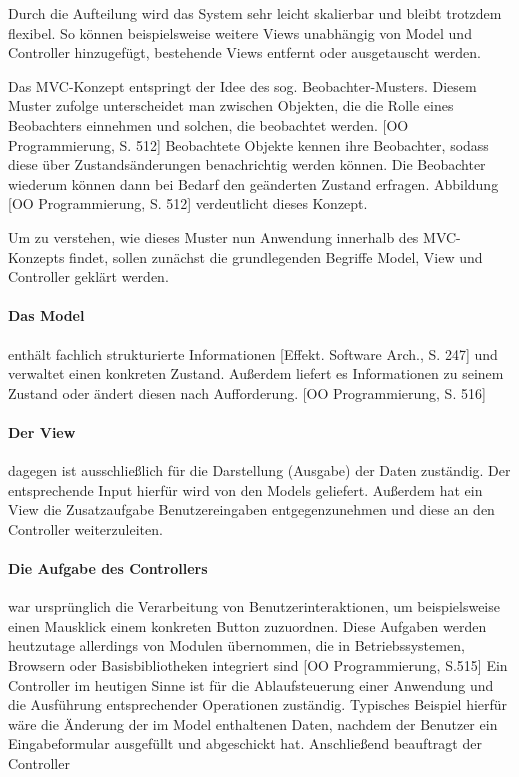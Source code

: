Durch die Aufteilung wird das System sehr leicht skalierbar und bleibt trotzdem flexibel. So können beispielsweise weitere Views unabhängig von Model und Controller hinzugefügt, bestehende Views entfernt oder ausgetauscht werden.

Das MVC-Konzept entspringt der Idee des sog. Beobachter-Musters. Diesem Muster zufolge unterscheidet man zwischen Objekten, die die Rolle eines Beobachters einnehmen und solchen, die beobachtet werden. [OO Programmierung, S. 512] Beobachtete Objekte kennen ihre Beobachter, sodass diese über Zustandsänderungen benachrichtig werden können. Die Beobachter wiederum können dann bei Bedarf den geänderten Zustand erfragen. Abbildung [OO Programmierung, S. 512] verdeutlicht dieses Konzept.

Um zu verstehen, wie dieses Muster nun Anwendung innerhalb des MVC-Konzepts findet, sollen zunächst die grundlegenden Begriffe Model, View und Controller geklärt werden.

\paragraph{Das Model} enthält fachlich strukturierte Informationen [Effekt. Software Arch., S. 247] und verwaltet einen konkreten Zustand. Außerdem liefert es Informationen zu seinem Zustand oder ändert diesen nach Aufforderung. [OO Programmierung, S. 516] 

\paragraph{Der View} dagegen ist ausschließlich für die Darstellung (Ausgabe) der Daten zuständig. Der entsprechende Input hierfür wird von den Models geliefert. Außerdem hat ein View die Zusatzaufgabe Benutzereingaben entgegenzunehmen und diese an den Controller weiterzuleiten.

\paragraph{Die Aufgabe des Controllers} war ursprünglich die Verarbeitung von Benutzerinteraktionen, um beispielsweise einen Mausklick einem konkreten Button zuzuordnen. Diese Aufgaben werden heutzutage allerdings von Modulen übernommen, die in Betriebssystemen, Browsern oder Basisbibliotheken integriert sind [OO Programmierung, S.515] Ein Controller im heutigen Sinne ist für die Ablaufsteuerung einer Anwendung und die Ausführung entsprechender Operationen zuständig. Typisches Beispiel hierfür wäre die Änderung der im Model enthaltenen Daten, nachdem der Benutzer ein Eingabeformular ausgefüllt und abgeschickt hat. Anschließend beauftragt der Controller

